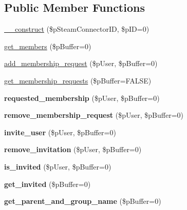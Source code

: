 \subsection*{Public Member Functions}
\begin{DoxyCompactItemize}
\item 
\hyperlink{classsteam__group_a406fd2aa67affa7f8dd68359c6228b31}{\_\-\_\-construct} (\$pSteamConnectorID, \$pID=0)
\item 
\hyperlink{classsteam__group_a7bc628a0186eda4b4d96ac58fcdeaedc}{get\_\-members} (\$pBuffer=0)
\item 
\hyperlink{classsteam__group_a58c02909a33dd39ee615830e749a5383}{add\_\-membership\_\-request} (\$pUser, \$pBuffer=0)
\item 
\hyperlink{classsteam__group_a66f1e2c1b80d58629bc5040cc6ada035}{get\_\-membership\_\-requests} (\$pBuffer=FALSE)
\item 
\hypertarget{classsteam__group_afaa2096cecfd86bb601cb86fe85ba49d}{
{\bfseries requested\_\-membership} (\$pUser, \$pBuffer=0)}
\label{classsteam__group_afaa2096cecfd86bb601cb86fe85ba49d}

\item 
\hypertarget{classsteam__group_a7bfb2c0166bb7ecf1c25f0abed2e8189}{
{\bfseries remove\_\-membership\_\-request} (\$pUser, \$pBuffer=0)}
\label{classsteam__group_a7bfb2c0166bb7ecf1c25f0abed2e8189}

\item 
\hypertarget{classsteam__group_a1c6f321a0ee641dc2a85c56d39e7d08f}{
{\bfseries invite\_\-user} (\$pUser, \$pBuffer=0)}
\label{classsteam__group_a1c6f321a0ee641dc2a85c56d39e7d08f}

\item 
\hypertarget{classsteam__group_a031263ffd560c110733892278e533ed2}{
{\bfseries remove\_\-invitation} (\$pUser, \$pBuffer=0)}
\label{classsteam__group_a031263ffd560c110733892278e533ed2}

\item 
\hypertarget{classsteam__group_a11d79092ae20163644e597675ccef400}{
{\bfseries is\_\-invited} (\$pUser, \$pBuffer=0)}
\label{classsteam__group_a11d79092ae20163644e597675ccef400}

\item 
\hypertarget{classsteam__group_aff8e1dfca0688b901e4ed8266aba4b9f}{
{\bfseries get\_\-invited} (\$pBuffer=0)}
\label{classsteam__group_aff8e1dfca0688b901e4ed8266aba4b9f}

\item 
\hypertarget{classsteam__group_a3fb566f8c7ed6bc93cb11bc27d3e04e9}{
{\bfseries get\_\-parent\_\-and\_\-group\_\-name} (\$pBuffer=0)}
\label{classsteam__group_a3fb566f8c7ed6bc93cb11bc27d3e04e9}


\end{DoxyCompactItemize}
